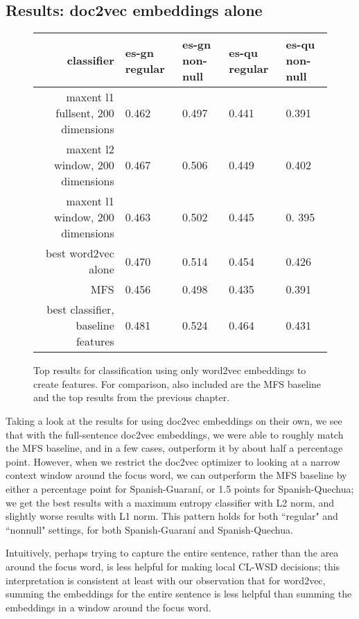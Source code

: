 \subsection{Results: doc2vec embeddings alone}

\begin{figure*}
  \begin{centering}
  \begin{tabulary}{\textwidth}{|R|L|L|L|L|}
    \hline
    classifier & es-gn regular & es-gn non-null & es-qu regular & es-qu non-null \\
    \hline
    maxent l1 fullsent, 200 dimensions & 0.462 & 0.497 & 0.441 & 0.391 \\
    \hline
    maxent l2 window, 200 dimensions & 0.467 & 0.506 & 0.449 & 0.402 \\
    \hline
    maxent l1 window, 200 dimensions & 0.463 & 0.502 & 0.445 & 0. 395\\
    \hline
    best word2vec alone & 0.470 & 0.514 & 0.454 & 0.426 \\
    \hline
    MFS    & 0.456 & 0.498 & 0.435 & 0.391 \\
    \hline
    best classifier, baseline features & 0.481 & 0.524 & 0.464 & 0.431 \\
    \hline
  \end{tabulary}
  \end{centering}
  \caption{Top results for classification using only word2vec embeddings to
  create features. For comparison, also included are the MFS baseline and the
  top results from the previous chapter.}
  \label{fig:doc2vec-alone-results}
\end{figure*}

Taking a look at the results for using doc2vec embeddings on their own, we see
that with the full-sentence doc2vec embeddings, we were able to roughly match
the MFS baseline, and in a few cases, outperform it by about half a percentage
point. However, when we restrict the doc2vec optimizer to looking at a narrow
context window around the focus word, we can outperform the MFS baseline by
either a percentage point for Spanish-Guaraní, or 1.5 points for
Spanish-Quechua; we get the best results with a maximum entropy classifier with
L2 norm, and slightly worse results with L1 norm. This pattern holds for both
``regular" and ``nonnull" settings, for both Spanish-Guaraní and
Spanish-Quechua.

Intuitively, perhaps trying to capture the entire sentence, rather than the
area around the focus word, is less helpful for making local CL-WSD decisions;
this interpretation is consistent at least with our observation that for
word2vec, summing the embeddings for the entire sentence is less helpful than
summing the embeddings in a window around the focus word.


